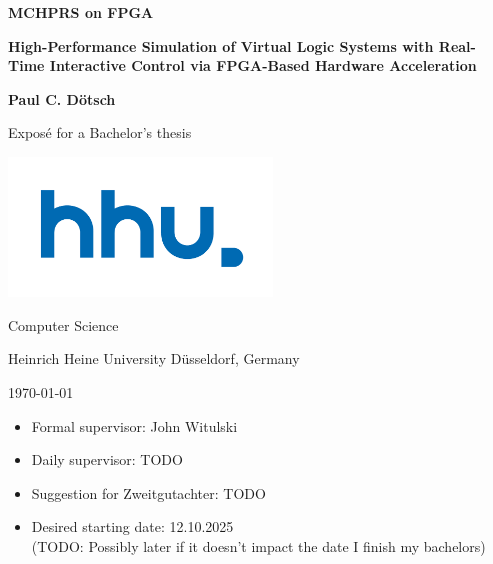 \documentclass[a4paper,11pt]{article}
\begin{document}
\begin{center}
    \vspace*{1cm}

    {\Huge\bfseries MCHPRS on FPGA}

    {\Large\bfseries High-Performance Simulation of Virtual Logic Systems with Real-Time Interactive Control via FPGA-Based Hardware Acceleration}

    \vspace{1.5cm}

    {\Large\bfseries Paul C. Dötsch}

    \vspace{1.5cm}

    {\Large Exposé for a Bachelor's thesis}

    \vspace{1.5cm}

    \includegraphics[width=7cm]{fig/hhu.pdf}

    \vspace{0.5cm}

    {\large
        Computer Science \par
        Heinrich Heine University Düsseldorf, Germany \par
        \today \par
    }

    \vspace{1cm}
\end{center}

\begin{itemize}[leftmargin=2cm, labelsep=0.5em, before=\large]
    \item Formal supervisor: John Witulski
    \item Daily supervisor: TODO
    \item Suggestion for Zweitgutachter: TODO
    \item Desired starting date: 12.10.2025 \\
    (TODO: Possibly later if it doesn't impact the date I finish my bachelors)
\end{itemize}

\vspace{2cm}
\end{document}
